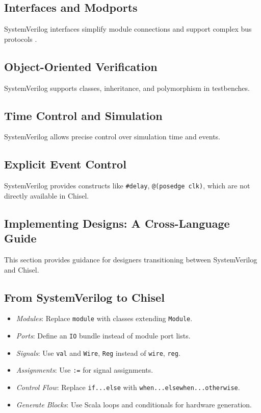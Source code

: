\subsection{Interfaces and Modports}

SystemVerilog interfaces simplify module connections and support complex bus protocols \cite{guyer2005introduction}.

\subsection{Object-Oriented Verification}

SystemVerilog supports classes, inheritance, and polymorphism in testbenches.

\subsection{Time Control and Simulation}

SystemVerilog allows precise control over simulation time and events.

\subsection{Explicit Event Control}

SystemVerilog provides constructs like \texttt{\#delay}, \texttt{@(posedge clk)}, which are not directly available in Chisel.

\subsection{Implementing Designs: A Cross-Language Guide}

This section provides guidance for designers transitioning between SystemVerilog and Chisel.

\subsection{From SystemVerilog to Chisel}

\begin{itemize}
    \item \textit{Modules}: Replace \texttt{module} with classes extending \texttt{Module}.
    \item \textit{Ports}: Define an \texttt{IO} bundle instead of module port lists.
    \item \textit{Signals}: Use \texttt{val} and \texttt{Wire}, \texttt{Reg} instead of \texttt{wire}, \texttt{reg}.
    \item \textit{Assignments}: Use \texttt{:=} for signal assignments.
    \item \textit{Control Flow}: Replace \texttt{if...else} with \texttt{when...elsewhen...otherwise}.
    \item \textit{Generate Blocks}: Use Scala loops and conditionals for hardware generation.
\end{itemize}

